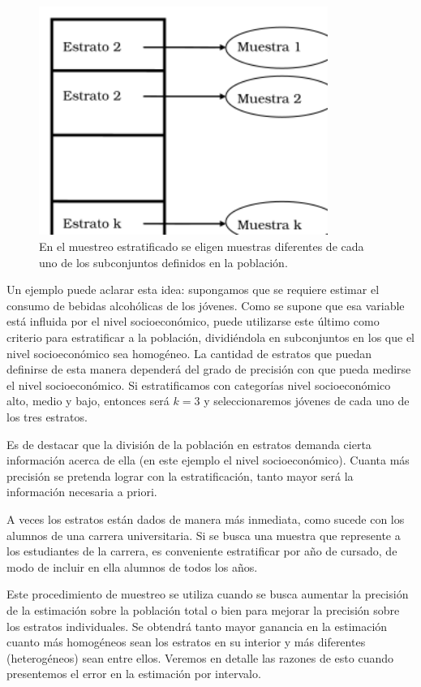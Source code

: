 \documentclass[]{book}
\begin{document}
\begin{figure}

{\centering \includegraphics[width=3.71in]{imagenes/image87} 

}

\caption{En el muestreo estratificado se eligen muestras diferentes de cada uno de los subconjuntos definidos en la población.}\label{fig:unnamed-chunk-202}
\end{figure}

Un ejemplo puede aclarar esta idea: supongamos que se requiere estimar
el consumo de bebidas alcohólicas de los jóvenes. Como se supone que esa
variable está influida por el nivel socioeconómico, puede utilizarse
este último como criterio para estratificar a la población, dividiéndola
en subconjuntos en los que el nivel socioeconómico sea homogéneo. La
cantidad de estratos que puedan definirse de esta manera dependerá del
grado de precisión con que pueda medirse el nivel socioeconómico. Si
estratificamos con categorías nivel socioeconómico alto, medio y bajo,
entonces será \(k=3\) y seleccionaremos jóvenes de cada uno de los tres
estratos.

Es de destacar que la división de la población en estratos demanda
cierta información acerca de ella (en este ejemplo el nivel
socioeconómico). Cuanta más precisión se pretenda lograr con la
estratificación, tanto mayor será la información necesaria a priori.

A veces los estratos están dados de manera más inmediata, como sucede
con los alumnos de una carrera universitaria. Si se busca una muestra
que represente a los estudiantes de la carrera, es conveniente
estratificar por año de cursado, de modo de incluir en ella alumnos de
todos los años.

Este procedimiento de muestreo se utiliza cuando se busca aumentar la
precisión de la estimación sobre la población total o bien para mejorar
la precisión sobre los estratos individuales. Se obtendrá tanto mayor
ganancia en la estimación cuanto más homogéneos sean los estratos en su
interior y más diferentes (heterogéneos) sean entre ellos. Veremos en
detalle las razones de esto cuando presentemos el error en la estimación
por intervalo.
\end{document}
